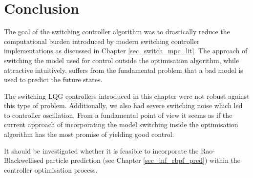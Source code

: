 \section{Conclusion}
The goal of the switching controller algorithm was to drastically reduce the computational burden introduced by modern switching controller implementations as discussed in Chapter \ref{sec_switch_mpc_lit}. The approach of switching the model used for control outside the optimisation algorithm, while attractive intuitively, suffers from the fundamental problem that a bad model is used to predict the future states.

The switching LQG controllers introduced in this chapter were not robust against this type of problem. Additionally, we also had severe switching noise which led to controller oscillation. From a fundamental point of view it seems as if the current approach of incorporating the model switching inside the optimisation algorithm has the most promise of yielding good control. 

It should be investigated whether it is feasible to incorporate the Rao-Blackwellised particle prediction (see Chapter \ref{sec_inf_rbpf_pred}) within the controller optimisation process.  